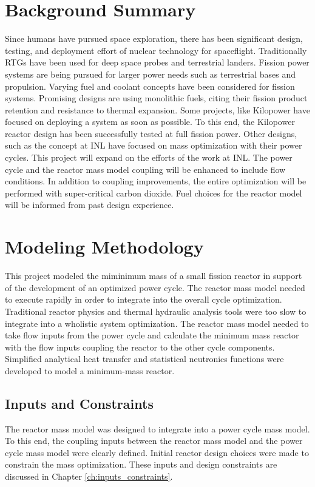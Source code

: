 \section{Background Summary}
Since humans have pursued space exploration, there has been significant design, 
testing, and deployment effort of nuclear technology for spaceflight. Traditionally
RTGs have been used for deep space probes and terrestrial landers. Fission power
systems are being pursued for larger power needs such as terrestrial bases and
propulsion. Varying fuel and coolant concepts have been considered for fission
systems. Promising designs are using monolithic fuels, citing their fission
product retention and resistance to thermal expansion. Some projects, like
Kilopower have focused on deploying a system as soon as possible. To this end,
the Kilopower reactor design has been successfully tested at full fission power.
Other designs, such as the concept at INL have focused on mass optimization with
their power cycles. This project will expand on the efforts of the work at INL.
The power cycle and the reactor mass model coupling will be enhanced to include
flow conditions. In addition to coupling improvements, the entire optimization
will be performed with super-critical carbon dioxide. Fuel choices for the
reactor model will be informed from past design experience.

\section{Modeling Methodology}
This project modeled the miminimum mass of a small fission reactor in support of
the development of an optimized power cycle. The reactor mass model needed to
execute rapidly in order to integrate into the overall cycle optimization.
Traditional reactor physics and thermal hydraulic analysis tools were too slow to
integrate into a wholistic system optimization. The reactor mass model needed to
take flow inputs from the power cycle and calculate the minimum mass reactor 
with the flow inputs coupling the reactor to the other cycle components. 
Simplified analytical heat transfer and statistical neutronics functions 
were developed to model a minimum-mass reactor.

\subsection{Inputs and Constraints}
The reactor mass model was designed to integrate into a power cycle mass model.
To this end, the coupling inputs between the reactor mass model and the power
cycle mass model were clearly defined. Initial reactor design choices were made
to constrain the mass optimization. These inputs and design constraints are
discussed in Chapter \ref{ch:inputs_constraints}.

